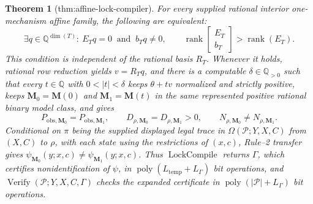 \documentclass{article}
\newtheorem{theorem}{Theorem}
\begin{document}
\begin{theorem}[thm:affine-lock-compiler]\label{thm:affine-lock-compiler}
For every supplied rational interior one-mechanism affine family, the following are equivalent:
\[
 \exists q\in\mathbb Q^{\dim(T)}:\ E_Tq=0\ \text{ and }\ b_Tq\neq0,
 \qquad
 \operatorname{rank}\!\begin{bmatrix}E_T\\ b_T\end{bmatrix}>
 \operatorname{rank}(E_T).
\]
This condition is independent of the rational basis \(R_T\).  Whenever it holds, rational row reduction yields \(v=R_Tq\), and there is a computable \(\delta\in\mathbb Q_{>0}\) such that every \(t\in\mathbb Q\) with \(0<|t|<\delta\) keeps \(\theta+t v\) normalized and strictly positive, keeps \(\mathbf M_0=\mathbf M(0)\) and \(\mathbf M_1=\mathbf M(t)\) in the same represented positive rational binary model class, and gives
\[
 P_{\mathrm{obs},\mathbf M_0}=P_{\mathrm{obs},\mathbf M_1},\qquad
 D_{\rho,\mathbf M_0}=D_{\rho,\mathbf M_1}>0,
 \qquad N_{\rho,\mathbf M_0}\neq N_{\rho,\mathbf M_1}.
\]
Conditional on \(\pi\) being the supplied displayed legal trace in \(\Omega(\mathcal P;Y,X,C)\) from \((X,C)\) to \(\rho\), with each state using the restrictions of \((x,c)\), Rule--2 transfer gives \(\psi_{\mathbf M_0}(y;x,c)\neq\psi_{\mathbf M_1}(y;x,c)\).  Thus \(\operatorname{LockCompile}\) returns \(\Gamma\), which certifies nonidentification of \(\psi\), in \(\operatorname{poly}(L_{\mathrm{temp}}+L_{\Gamma})\) bit operations, and \(\operatorname{Verify}(\mathcal P;Y,X,C,\Gamma)\) checks the expanded certificate in \(\operatorname{poly}(|\mathcal P|+L_{\Gamma})\) bit operations.
\end{theorem}
\end{document}
